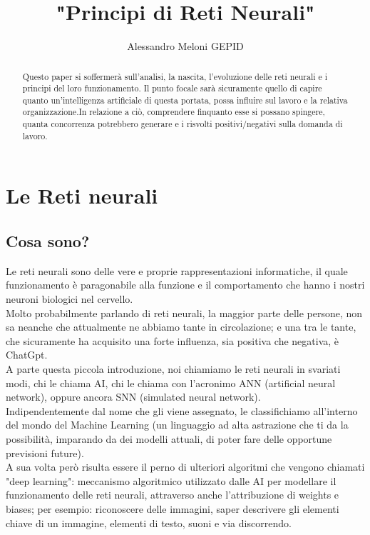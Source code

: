 \documentclass{article}
\title{\textbf{"Principi di Reti Neurali"}}
\author{Alessandro Meloni GEPID}
\date{}
\begin{document}
\maketitle
\begin{abstract}
\begin{justify}
    Questo paper si soffermerà sull'analisi, la nascita, l'evoluzione delle reti neurali e i principi del loro funzionamento. Il punto focale sarà sicuramente quello di capire quanto un'intelligenza artificiale di questa portata, possa influire sul lavoro e la relativa organizzazione.In relazione a ciò, comprendere finquanto esse si possano spingere, quanta concorrenza potrebbero generare e i risvolti positivi/negativi sulla domanda di lavoro.
\end{justify}
\end{abstract}
\centering \tableofcontents
\centering \newpage
\section{Le Reti neurali}
\flushleft \subsection{Cosa sono?}
\begin{justify}
    Le reti neurali sono delle vere e proprie rappresentazioni informatiche, il quale funzionamento è paragonabile alla funzione e il comportamento che hanno i nostri neuroni biologici nel cervello.\\
    Molto probabilmente parlando di reti neurali, la maggior parte delle persone, non sa neanche che attualmente ne abbiamo tante in circolazione; e una tra le tante, che sicuramente ha acquisito una forte influenza, sia positiva che negativa, è ChatGpt.\\
    A parte questa piccola introduzione, noi chiamiamo le reti neurali in svariati modi, chi le chiama AI, chi le chiama con l'acronimo ANN (artificial neural network), oppure ancora SNN (simulated neural network).\citep{IBM2021} \\
    Indipendentemente dal nome che gli viene assegnato, le classifichiamo all'interno del mondo del Machine Learning (un linguaggio ad alta astrazione che ti da la possibilità, imparando da dei modelli attuali, di poter fare delle opportune previsioni future).\\
    A sua volta però risulta essere il perno di ulteriori algoritmi che vengono chiamati "deep learning": meccanismo algoritmico utilizzato dalle AI per modellare il funzionamento delle reti neurali, attraverso anche l'attribuzione di weights e biases; per esempio: riconoscere delle immagini, saper descrivere gli elementi chiave di un immagine, elementi di testo, suoni e via discorrendo.\citep{AWS2022}
\end{justify}
\end{document}
